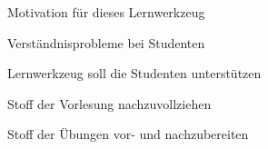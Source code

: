 



{
    \begin{itemgroup}{}
	\item Motivation für dieses Lernwerkzeug
		\begin{itemgroup}{}
		\item Verständnisprobleme bei Studenten
		\end{itemgroup}	
		\item Lernwerkzeug soll die Studenten unterstützen
			\begin{itemgroup}{}
			\item Stoff der Vorlesung nachzuvollziehen
			\item Stoff der Übungen vor- und nachzubereiten
			\end{itemgroup}
	\end{itemgroup}
    
	\vfill{}
}


